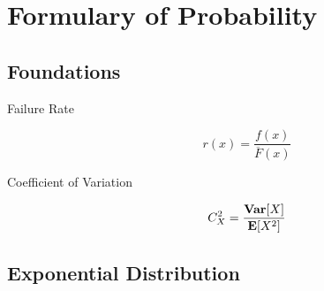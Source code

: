 \section{Formulary of Probability}
\label{sec:Formulary-Probability}




\subsection{Foundations}

\begin{description}
	
	\item [Failure Rate]
		\begin{equation}
		r(x) = \frac{f(x)}{\overline{F}(x)}
		\end{equation}
	
	\item [Coefficient of Variation]
		\begin{equation}
		C_{X}^{2} = \frac{\mathbf{Var}[X]}{\mathbf{E}[X^{2}]}
		\end{equation}
	
\end{description}




\subsection{Exponential Distribution}

